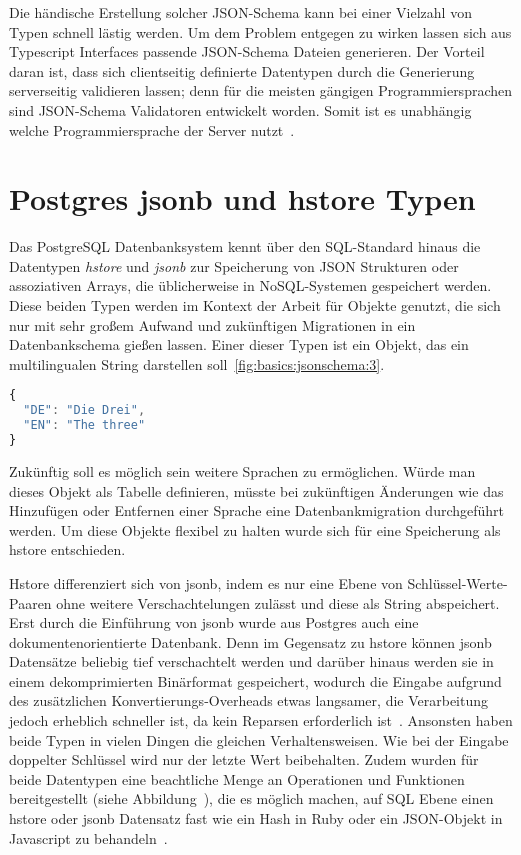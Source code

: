 Die händische Erstellung solcher JSON-Schema kann bei einer Vielzahl von Typen schnell lästig werden.
Um dem Problem entgegen zu wirken lassen sich aus Typescript Interfaces passende JSON-Schema Dateien generieren.
Der Vorteil daran ist, dass sich clientseitig definierte Datentypen durch die Generierung serverseitig validieren lassen;
denn für die meisten gängigen Programmiersprachen sind JSON-Schema Validatoren entwickelt worden.
Somit ist es unabhängig welche Programmiersprache der Server nutzt~\cite{json-schema-implementations}.


\section{Postgres jsonb und hstore Typen}
\label{sec:basics:postgres}
Das PostgreSQL Datenbanksystem kennt über den SQL-Standard hinaus die Datentypen \emph{hstore} und \emph{jsonb} zur Speicherung von JSON Strukturen oder assoziativen Arrays, die üblicherweise in NoSQL-Systemen gespeichert werden.
Diese beiden Typen werden im Kontext der Arbeit für Objekte genutzt, die sich nur mit sehr großem Aufwand und zukünftigen Migrationen in ein Datenbankschema gießen lassen. Einer dieser Typen ist ein Objekt, das ein multilingualen String darstellen soll~\ref{fig:basics:jsonschema:3}. 

\begin{lstlisting}[language=Javascript,float=h!,caption={Multilinguales Objekt}, label={fig:basics:jsonschema:3}]
{
  "DE": "Die Drei",
  "EN": "The three"
}
\end{lstlisting}

Zukünftig soll es möglich sein weitere Sprachen zu ermöglichen. Würde man dieses Objekt als Tabelle definieren, müsste bei zukünftigen Änderungen wie das Hinzufügen oder Entfernen einer Sprache eine Datenbankmigration durchgeführt werden. Um diese Objekte flexibel zu halten wurde sich für eine Speicherung als hstore entschieden.

Hstore differenziert sich von jsonb, indem es nur eine Ebene von Schlüssel-Werte-Paaren ohne weitere Verschachtelungen zulässt und diese als String abspeichert. Erst durch die Einführung von jsonb wurde aus Postgres auch eine dokumentenorientierte Datenbank.
Denn im Gegensatz zu hstore können jsonb Datensätze beliebig tief verschachtelt werden und
darüber hinaus werden sie in einem dekomprimierten Binärformat gespeichert, wodurch die Eingabe aufgrund des zusätzlichen Konvertierungs-Overheads etwas langsamer,
die Verarbeitung jedoch erheblich schneller ist, da kein Reparsen erforderlich ist~\cite{postgresql-json}.
Ansonsten haben beide Typen in vielen Dingen die gleichen Verhaltensweisen. Wie bei der Eingabe doppelter Schlüssel wird nur der letzte Wert beibehalten.
Zudem wurden für beide Datentypen eine beachtliche Menge an Operationen und Funktionen bereitgestellt (siehe Abbildung~), die es möglich machen,
auf SQL Ebene einen hstore oder jsonb Datensatz fast wie ein Hash in Ruby oder ein JSON-Objekt in Javascript zu behandeln~\cite{postgresql-hstore}.

